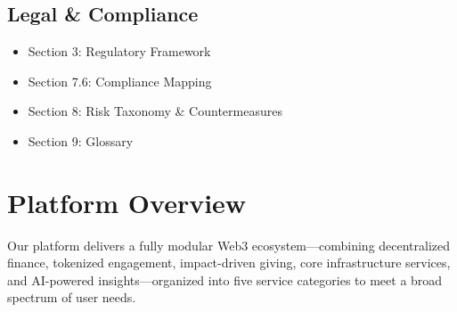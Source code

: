 \documentclass[13pt]{extarticle}
\begin{document}
\subsection*{Legal \& Compliance}
\begin{itemize}[leftmargin=2em,noitemsep]
  \item Section 3: Regulatory Framework
  \item Section 7.6: Compliance Mapping
  \item Section 8: Risk Taxonomy \& Countermeasures
  \item Section 9: Glossary
\end{itemize}


\newpage
\section{Platform Overview}

Our platform delivers a fully modular Web3 ecosystem—combining decentralized finance, tokenized engagement, impact-driven giving, core infrastructure services, and AI-powered insights—organized into five service categories to meet a broad spectrum of user needs. 
\end{document}
